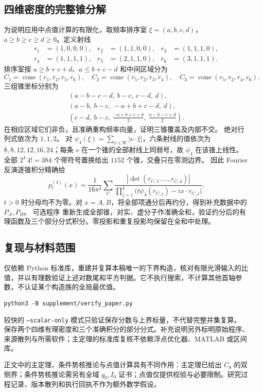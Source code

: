 \subsection{四维密度的完整锥分解}
为说明应用中点值计算的有限化，取频率排序室
$\xi=(a,b,c,d)$，$a\ge b\ge c\ge d\ge0$。定义射线
\[
\begin{aligned}
 r_1&=(1,0,0,0),&r_2&=(1,1,0,0),&r_3&=(1,1,1,0),\\
 r_4&=(1,1,1,1),&r_5&=(2,1,1,0),&r_6&=(3,1,1,1).
\end{aligned}
\]
排序室按 $a\ge b+c+d$、$a\le b+c-d$ 和中间区域分为
\[
 C_1=\operatorname{cone}(r_1,r_2,r_5,r_6),\quad
 C_2=\operatorname{cone}(r_5,r_2,r_3,r_4),\quad
 C_3=\operatorname{cone}(r_5,r_2,r_4,r_6).
\]
三组锥坐标分别为
\[
\begin{gathered}
 (a-b-c-d,\ b-c,\ c-d,\ d),\\
 (a-b,\ b-c,\ -a+b+c-d,\ d),\\
 \left(c-d,\ b-c,\ \frac{-a+b+c+d}{2},\
                  \frac{a-b-c+d}{2}\right).
\end{gathered}
\]
在相应区域它们非负，且准确重构频率向量，证明三锥覆盖及内部不交。
绝对行列式依次为 $1,1,2$。
对 $\psi_4(\xi)=\sum_{v\in W}|v\cdot\xi|$，六条射线的值依次为
$8,8,12,12,16,24$；每条 $v$ 在一个锥的全部射线上同弱号，故
$\psi_4$ 在该锥上线性。
全部 $2^4\,4!=384$ 个带符号置换给出 $1152$ 个锥，交叠只在零测边界。
因此 Fourier 反演逐锥积分精确给
\[
 p_t^{(4)}(x)=\frac1{16\pi^4}
 \sum_C\frac{|\det(r_{C,1},\ldots,r_{C,4})|}
 {\prod_{j=1}^4\bigl(t\psi_4(r_{C,j})-i x\cdot r_{C,j}\bigr)}.
\]
$t>0$ 时分母均不为零。对 $x=A,B$，将全部项通分后再约分，得到补充数据中的 $P_A,P_B$。
可选程序  重新生成全部锥，对实、虚分子作准确全和，验证约分后的有理函数及三个部分分式积分。零投影和重复投影均保留在全和中处理。

\subsection{复现与材料范围}
 仅依赖 Python 标准库，重建并复算本稿唯一的下界构造，核对有限光滑输入的比值，并以有理数验证上述对数尾和平方判据。它不执行搜索，不计算其他首轴参数，不认证某个构造族的全局最优值。
\begin{verbatim}
python3 -B supplement/verify_paper.py
\end{verbatim}
较快的 \texttt{--scalar-only} 模式只验证保存分数与上界标量，不代替完整并集复算。
 保存两个四维有理密度和三个准确积分的部分分式。补充说明另外标明原始程序、来源散列与所需软件；主定理的标准库复核不依赖浮点优化器、MATLAB 或区间库。

正文中的主定理、条件势核推论与点值计算具有不同作用：主定理已给出 $C_8$ 的双侧界；条件势核推论需另有全域 $g_0,I_0$ 证书；点值仅提供校验与必要限制。研究过程记录、版本散列和执行回执不作为额外数学假设。
